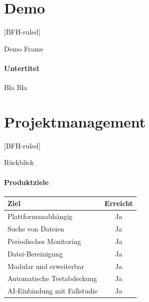 \documentclass[
    ngerman,%
    authorontitle=true,
]{bfhbeamer}
\begin{document}
    \section{Demo}\label{sec:demo}
    [BFH-ruled]
    \frame{\sectionpage}

    \begin{frame}{Demo Frame}
        \framesubtitle{Untertitel}
        Bla Bla
    \end{frame}

    \section{Projektmanagement}\label{sec:projektmanagement}
    [BFH-ruled]
    \frame{\sectionpage}

    \begin{frame}{Rückblick}
        \framesubtitle{Produktziele}
        {
            \centering
            \begin{tabular}{l|c}
                \textbf{Ziel}                & \textbf{Erreicht} \\
                \hline
                Plattformunabhängig          & Ja                \\
                Suche von Dateien            & Ja                \\
                Periodisches Monitoring      & Ja                \\
                Datei-Bereinigung            & Ja                \\
                Modular und erweiterbar      & Ja                \\
                Automatische Testabdeckung   & Ja                \\
                AI-Einbindung mit Fallstudie & Ja                \\
            \end{tabular}\par
        }

    \end{frame}
\end{document}
